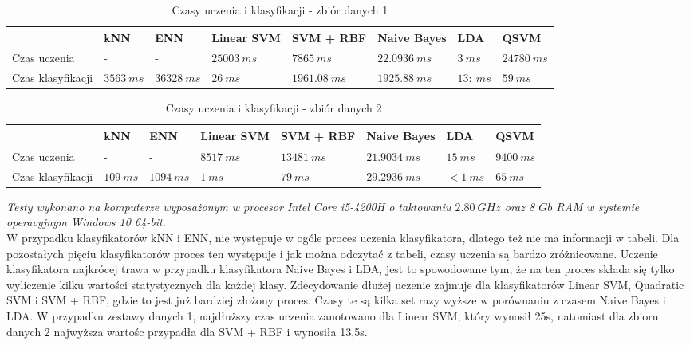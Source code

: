 \documentclass[[10pt,a4paper]{article}
\begin{document}
\begin{table}[h]
\centering
\caption{Czasy uczenia i klasyfikacji  - zbiór danych 1}
\label{timesTable2}
\begin{tabular}{l|l|l|l|l|l|l|l|}
\cline{2-7}
                                        & kNN & ENN & Linear SVM & SVM + RBF & Naive Bayes & LDA & QSVM \\ \hline
\multicolumn{1}{|l|}{Czas uczenia}      &  -  &  -   &  $25003\: ms$   &   $7865\: ms$   &   $22.0936 \: ms$ & $3\: ms$  & $24 780\: ms$  \\ \hline
\multicolumn{1}{|l|}{Czas klasyfikacji} &  $3563 \: ms$&   $36328\: ms$   &   $26\: ms$  &      $1961.08\: ms$&     $1925.88\: ms$        & $13 :\ ms$ &$59\:ms$ \\ \hline
\end{tabular}
\end{table}

\begin{table}[h]
\centering
\caption{Czasy uczenia i klasyfikacji - zbiór danych 2}
\label{timesTable1}
\begin{tabular}{l|l|l|l|l|l|l|l|}
\cline{2-7}
                                        & kNN & ENN & Linear SVM & SVM + RBF & Naive Bayes & LDA &QSVM \\ \hline
\multicolumn{1}{|l|}{Czas uczenia}      &  -  &  -   &  $8517\: ms$   &   $13481\: ms$   &   $21.9034\: ms$ & $15\: ms$  & $9400\:ms$  \\ \hline
\multicolumn{1}{|l|}{Czas klasyfikacji} &  $109 \: ms$   &   $1094\: ms$   &   $1\: ms$  &      $79\: ms$     &     $29.2936\: ms$        & $< 1\: ms$ & $65\:ms$ \\ \hline
\end{tabular}
\end{table}

\emph{Testy wykonano na komputerze wyposażonym w procesor Intel Core i5-4200H o taktowaniu $2.80 \: GHz$ oraz 8 $Gb$ RAM w systemie operacyjnym Windows 10 64-bit. }\\

W przypadku klasyfikatorów kNN i ENN, nie występuje w ogóle proces uczenia klasyfikatora, dlatego też nie ma informacji w tabeli. Dla pozostałych pięciu klasyfikatorów proces ten występuje i jak można odczytać z tabeli, czasy uczenia są bardzo zróżnicowane. Uczenie klasyfikatora najkrócej trawa w przypadku klasyfikatora Naive Bayes i LDA, jest to spowodowane tym, że na ten proces składa się tylko wyliczenie kilku wartości statystycznych dla każdej klasy. Zdecydowanie dłużej uczenie zajmuje dla klasyfikatorów Linear SVM, Quadratic SVM i SVM + RBF, gdzie to jest już bardziej złożony proces. Czasy te są kilka set razy wyższe w porównaniu z czasem Naive Bayes i LDA. W przypadku zestawy danych 1, najdłuższy czas uczenia zanotowano dla Linear SVM, który wynosił 25s, natomiast dla zbioru danych 2 najwyższa wartośc przypadła dla SVM + RBF i wynosiła 13,5s. 
\end{document}

